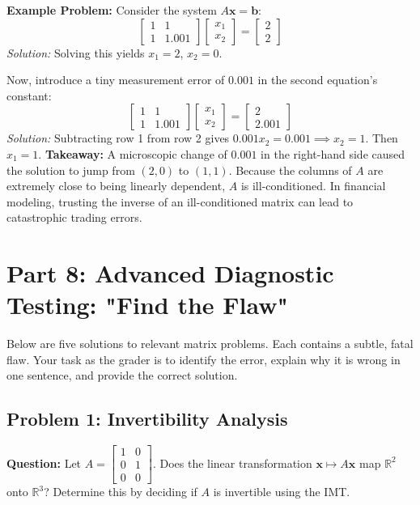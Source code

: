 \documentclass[12pt]{article}
\begin{document}
\textbf{Example Problem:}
Consider the system $A\mathbf{x} = \mathbf{b}$:
\[
\begin{bmatrix} 1 & 1 \\ 1 & 1.001 \end{bmatrix} \begin{bmatrix} x_1 \\ x_2 \end{bmatrix} = \begin{bmatrix} 2 \\ 2 \end{bmatrix}
\]
\textit{Solution:}
Solving this yields $x_1 = 2$, $x_2 = 0$. 

Now, introduce a tiny measurement error of $0.001$ in the second equation's constant:
\[
\begin{bmatrix} 1 & 1 \\ 1 & 1.001 \end{bmatrix} \begin{bmatrix} x_1 \\ x_2 \end{bmatrix} = \begin{bmatrix} 2 \\ 2.001 \end{bmatrix}
\]
\textit{Solution:}
Subtracting row 1 from row 2 gives $0.001x_2 = 0.001 \implies x_2 = 1$. Then $x_1 = 1$. 
\textbf{Takeaway:} A microscopic change of $0.001$ in the right-hand side caused the solution to jump from $(2,0)$ to $(1,1)$. Because the columns of $A$ are extremely close to being linearly dependent, $A$ is ill-conditioned. In financial modeling, trusting the inverse of an ill-conditioned matrix can lead to catastrophic trading errors.


\section{Part 8: Advanced Diagnostic Testing: "Find the Flaw"}

Below are five solutions to relevant matrix problems. Each contains a subtle, fatal flaw. Your task as the grader is to identify the error, explain why it is wrong in one sentence, and provide the correct solution.

\subsection{Problem 1: Invertibility Analysis}
\textbf{Question:} Let $A = \begin{bmatrix} 1 & 0 \\ 0 & 1 \\ 0 & 0 \end{bmatrix}$. Does the linear transformation $\mathbf{x} \mapsto A\mathbf{x}$ map $\mathbb{R}^2$ onto $\mathbb{R}^3$? Determine this by deciding if $A$ is invertible using the IMT.
\end{document}
